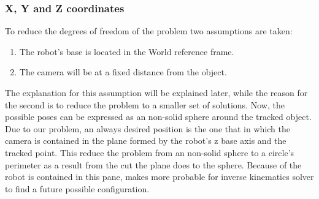 	\subsubsection{X, Y and Z coordinates} %
	\label{subsub:x_y_and_z_coordinates}
	To reduce the degrees of freedom of the problem two assumptions are taken:
	\begin{enumerate}
		\item The robot's base is located in the World reference frame.
		\item The camera will be at a fixed distance from the object.
	\end{enumerate}
	The explanation for this assumption will be explained later, while the reason for the second is to reduce the problem to a smaller set of solutions. 
	Now, the possible poses can be expressed as an non-solid sphere around the tracked object.
	Due to our problem, an always desired position is the one that in which the camera is contained in the plane formed by the robot's z base axis and the tracked point. This reduce the problem from an non-solid sphere to a circle's perimeter as a result from the cut the plane does to the sphere.
	Because of the robot is contained in this pane, makes more probable for inverse kinematics solver to find a future possible configuration.\\

